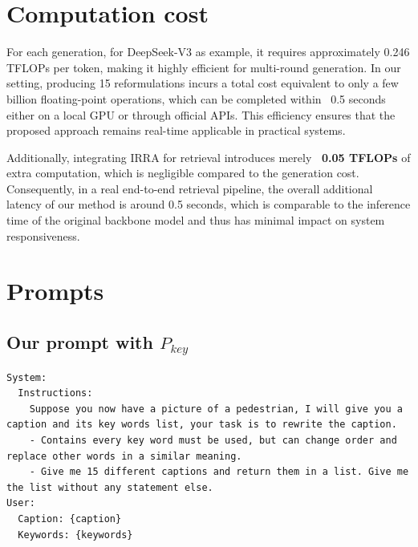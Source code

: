 \clearpage
\setcounter{page}{1}
\maketitlesupplementary

\section{Computation cost}
For each generation, for DeepSeek-V3 as example, it requires approximately 0.246 TFLOPs per token, making it highly efficient for multi-round generation. In our setting, producing 15 reformulations incurs a total cost equivalent to only a few billion floating-point operations, which can be completed within ~0.5 seconds either on a local GPU or through official APIs. This efficiency ensures that the proposed approach remains real-time applicable in practical systems.

Additionally, integrating IRRA for retrieval introduces merely \textbf{~0.05 TFLOPs} of extra computation, which is negligible compared to the generation cost. Consequently, in a real end-to-end retrieval pipeline, the overall additional latency of our method is around 0.5 seconds, which is comparable to the inference time of the original backbone model and thus has minimal impact on system responsiveness.

\section{Prompts}

\subsection{Our prompt with $P_{key}$}

\begin{minipage}[t]{0.48\textwidth}
\begin{tcolorbox}[
  title=Prompt with $P_{key}$,
  colback=lightgray,
  colframe=gray!70,
  fonttitle=\bfseries,
  boxrule=0.5pt,
  arc=3pt,
  top=1mm, bottom=1mm, left=1mm, right=1mm,
  sharp corners,
]

\lstset{
  basicstyle=\ttfamily,  
  breaklines=true,            
  breakatwhitespace=true,       
  columns=fullflexible,
  keepspaces=true
}


\footnotesize
\begin{lstlisting}[language=Prompt]
System:
  Instructions:
    Suppose you now have a picture of a pedestrian, I will give you a caption and its key words list, your task is to rewrite the caption.
    - Contains every key word must be used, but can change order and replace other words in a similar meaning.
    - Give me 15 different captions and return them in a list. Give me the list without any statement else.
User:
  Caption: {caption}
  Keywords: {keywords}
\end{lstlisting}

\end{tcolorbox}
\end{minipage}




